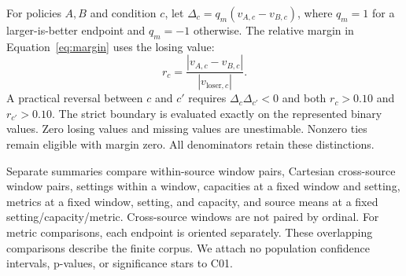 For policies $A,B$ and condition $c$, let
$\Delta_c=q_m(v_{A,c}-v_{B,c})$, where $q_m=1$ for a larger-is-better
endpoint and $q_m=-1$ otherwise. The relative margin in Equation~\ref{eq:margin} uses the losing value:
\begin{equation}\label{eq:margin}
 r_c=\frac{|v_{A,c}-v_{B,c}|}{|v_{\mathrm{loser},c}|}.
\end{equation}
A practical reversal between $c$ and $c'$ requires
$\Delta_c\Delta_{c'}<0$ and both $r_c>0.10$ and $r_{c'}>0.10$.
The strict boundary is evaluated exactly on the represented binary values.
Zero losing values and missing values are unestimable. Nonzero ties remain
eligible with margin zero. All denominators retain these distinctions.

Separate summaries compare within-source window pairs, Cartesian
cross-source window pairs, settings within a window, capacities at a fixed window and setting,
metrics at a fixed window, setting, and capacity, and source means
at a fixed setting/capacity/metric. Cross-source windows are not paired by
ordinal. For metric comparisons, each endpoint is oriented separately.
These overlapping comparisons describe the finite corpus. We attach no
population confidence intervals, p-values, or significance stars to C01.
